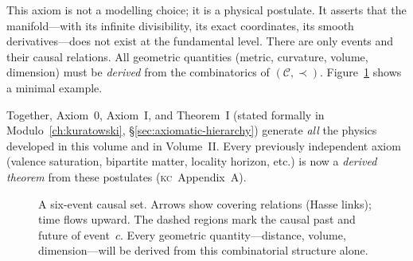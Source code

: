 \documentclass[11pt, a4paper, openany]{book}
\newcommand{\KC}[1]{\textnormal{(\textsc{kc}~#1)}}
\begin{document}
\noindent
This axiom is not a modelling choice; it is a physical postulate. It
asserts that the manifold---with its infinite divisibility, its exact
coordinates, its smooth derivatives---does not exist at the fundamental
level. There are only events and their causal relations. All geometric
quantities (metric, curvature, volume, dimension) must be \emph{derived}
from the combinatorics of $(\mathcal{C}, \prec)$.
Figure~\ref{fig:small-causet} shows a minimal example.

Together, Axiom~0, Axiom~I, and Theorem~I
(stated formally in Modulo~\ref{ch:kuratowski},
\S\ref{sec:axiomatic-hierarchy}) generate
\emph{all} the physics developed in this volume and in Volume~II. Every
previously independent axiom (valence saturation, bipartite matter,
locality horizon, etc.) is now a \emph{derived theorem} from these
postulates \KC{Appendix~A}.

\begin{figure}[ht]
\centering
{}
\caption{A six-event causal set. Arrows show covering relations (Hasse
links); time flows upward.  The dashed regions mark the causal past and
future of event~$c$.  Every geometric quantity---distance, volume,
dimension---will be derived from this combinatorial structure alone.}
\label{fig:small-causet}
\end{figure}
\end{document}
